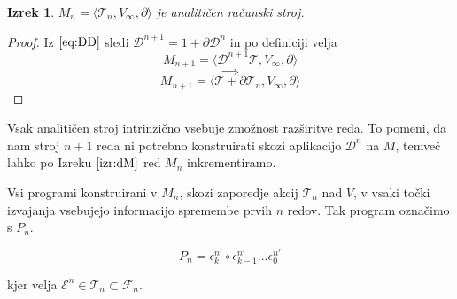\documentclass{article}
\newcommand{\II}{\mathbb{I}}
\newcommand{\E}{\mathcal{E}}
\newcommand{\T}{\mathcal{T}}
\newcommand{\F}{\mathcal{F}}
\newcommand{\D}{\partial}
\newcommand{\Dplus}{\mathcal{D}}
\newtheorem{izrek}{Izrek}[section]
\begin{document}
  \begin{izrek}\label{izr:dM}
	$M_n=\langle\T_n, V_\infty, \D\rangle$ je analitičen računski stroj.
  \end{izrek}

\begin{proof}
	Iz $\eqref{eq:DD}$ sledi $\Dplus^{n+1}=1+\D\Dplus^n$ in po definiciji velja	
	$$M_{n+1}=\langle\Dplus^{n+1}\T,V_\infty,\D\rangle$$
		$$\implies$$
	$$M_{n+1}=\langle\T+\D\T_n,V_\infty,\D\rangle$$	
\end{proof}


  Vsak analitičen stroj intrinzično vsebuje zmožnost razširitve reda. To pomeni, da nam stroj $n+1$ reda ni potrebno konstruirati skozi aplikacijo $\Dplus^n$ na $M$, temveč lahko po Izreku $\ref{izr:dM}$ red $M_{n}$ inkrementiramo.
  
  Vsi programi konstruirani v $M_n$, skozi zaporedje akcij $\T_n$ nad $V$, v vsaki točki izvajanja vsebujejo informacijo spremembe prvih $n$ redov. Tak program označimo s $P_n$.
  
  \begin{equation}
  P_{n} = \epsilon^{n'}_k\circ\epsilon^{n'}_{k-1}\ldots\epsilon^{n'}_0
  \end{equation}
  
kjer velja $\E^n\in\T_n\subset\F_n$.
 
 
\end{document}

